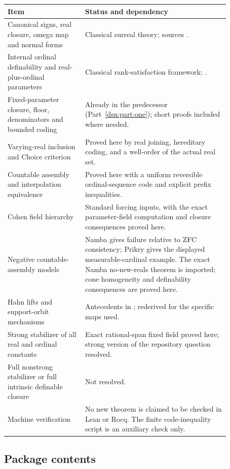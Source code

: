 \documentclass[11pt,a4paper]{article}
\numberwithin{equation}{section}
\theoremstyle{definition}
\theoremstyle{remark}
\begin{document}
\begin{longtable}{>{\raggedright\arraybackslash}p{0.30\linewidth}>{\raggedright\arraybackslash}p{0.57\linewidth}}
\toprule
Item & Status and dependency\\
\midrule
\endhead
Canonical signs, real closure, omega map and normal forms & Classical surreal theory; sources \cite{Conway,Gonshor,vdDE}.\\
Internal ordinal definability and real-plus-ordinal parameters & Classical rank-satisfaction framework; \cite{DoraisHamkins}.\\
Fixed-parameter closure, floor, denominators and bounded coding & Already in the predecessor (Part~\ref{dsn:part:one}); short proofs included where needed.\\
Varying-real inclusion and Choice criterion & Proved here by real joining, hereditary coding, and a well-order of the actual real set.\\
Countable assembly and interpolation equivalence & Proved here with a uniform reversible ordinal-sequence code and explicit prefix inequalities.\\
Cohen field hierarchy & Standard forcing inputs, with the exact parameter-field computation and closure consequences proved here.\\
Negative countable-assembly models & Namba gives failure relative to ZFC consistency; Prikry gives the displayed measurable-cardinal example. The exact Namba no-new-reals theorem is imported; cone homogeneity and definability consequences are proved here.\\
Hahn lifts and support-orbit mechanisms & Antecedents in \cite{RepoOpa,RepoSse}; rederived for the specific maps used.\\
Strong stabilizer of all real and ordinal constants & Exact rational-span fixed field proved here; strong version of the repository question resolved.\\
Full nonstrong stabilizer or full intrinsic definable closure & Not resolved.\\
Machine verification & No new theorem is claimed to be checked in Lean or Rocq. The finite code-inequality script is an auxiliary check only.\\
\bottomrule
\end{longtable}

\subsection{Package contents}
\end{document}
